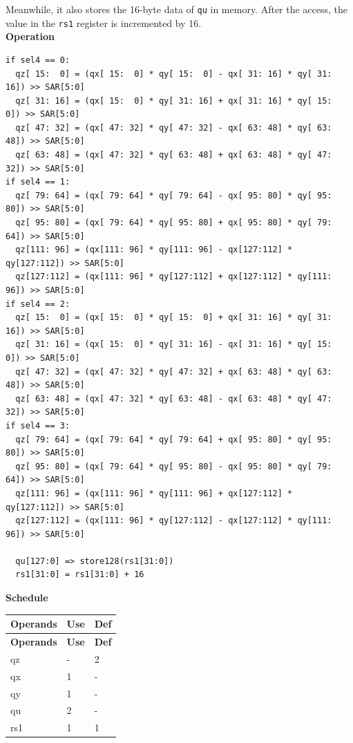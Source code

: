 Meanwhile, it also stores the 16-byte data of \lstinline{qu} in memory. After the access, the value in the \lstinline{rs1} register is incremented by 16.\\
\textbf{Operation}
\begin{lstlisting}
if sel4 == 0:
  qz[ 15:  0] = (qx[ 15:  0] * qy[ 15:  0] - qx[ 31: 16] * qy[ 31: 16]) >> SAR[5:0]
  qz[ 31: 16] = (qx[ 15:  0] * qy[ 31: 16] + qx[ 31: 16] * qy[ 15:  0]) >> SAR[5:0]
  qz[ 47: 32] = (qx[ 47: 32] * qy[ 47: 32] - qx[ 63: 48] * qy[ 63: 48]) >> SAR[5:0]
  qz[ 63: 48] = (qx[ 47: 32] * qy[ 63: 48] + qx[ 63: 48] * qy[ 47: 32]) >> SAR[5:0]
if sel4 == 1:
  qz[ 79: 64] = (qx[ 79: 64] * qy[ 79: 64] - qx[ 95: 80] * qy[ 95: 80]) >> SAR[5:0]
  qz[ 95: 80] = (qx[ 79: 64] * qy[ 95: 80] + qx[ 95: 80] * qy[ 79: 64]) >> SAR[5:0]
  qz[111: 96] = (qx[111: 96] * qy[111: 96] - qx[127:112] * qy[127:112]) >> SAR[5:0]
  qz[127:112] = (qx[111: 96] * qy[127:112] + qx[127:112] * qy[111: 96]) >> SAR[5:0]
if sel4 == 2:
  qz[ 15:  0] = (qx[ 15:  0] * qy[ 15:  0] + qx[ 31: 16] * qy[ 31: 16]) >> SAR[5:0]
  qz[ 31: 16] = (qx[ 15:  0] * qy[ 31: 16] - qx[ 31: 16] * qy[ 15:  0]) >> SAR[5:0]
  qz[ 47: 32] = (qx[ 47: 32] * qy[ 47: 32] + qx[ 63: 48] * qy[ 63: 48]) >> SAR[5:0]
  qz[ 63: 48] = (qx[ 47: 32] * qy[ 63: 48] - qx[ 63: 48] * qy[ 47: 32]) >> SAR[5:0]
if sel4 == 3:
  qz[ 79: 64] = (qx[ 79: 64] * qy[ 79: 64] + qx[ 95: 80] * qy[ 95: 80]) >> SAR[5:0]
  qz[ 95: 80] = (qx[ 79: 64] * qy[ 95: 80] - qx[ 95: 80] * qy[ 79: 64]) >> SAR[5:0]
  qz[111: 96] = (qx[111: 96] * qy[111: 96] + qx[127:112] * qy[127:112]) >> SAR[5:0]
  qz[127:112] = (qx[111: 96] * qy[127:112] - qx[127:112] * qy[111: 96]) >> SAR[5:0]

  qu[127:0] => store128(rs1[31:0])
  rs1[31:0] = rs1[31:0] + 16
\end{lstlisting}

\textbf{Schedule}\\
\begin{longtable}[c]{|l|l|l|}
    \hline
    \rowcolor{lightgray}
    \textbf{Operands} & \textbf{Use} & \textbf{Def} \\\hline
    \endfirsthead
    \hline
    \rowcolor{lightgray}
     \textbf{Operands} & \textbf{Use} & \textbf{Def} \\\hline
    \endhead
    \hline
    \endfoot


    qz & - & 2 \\\hline
     qx & 1 & - \\\hline
     qy & 1 & - \\\hline
     qu & 2 & - \\\hline
     rs1 & 1 & 1

\end{longtable}

